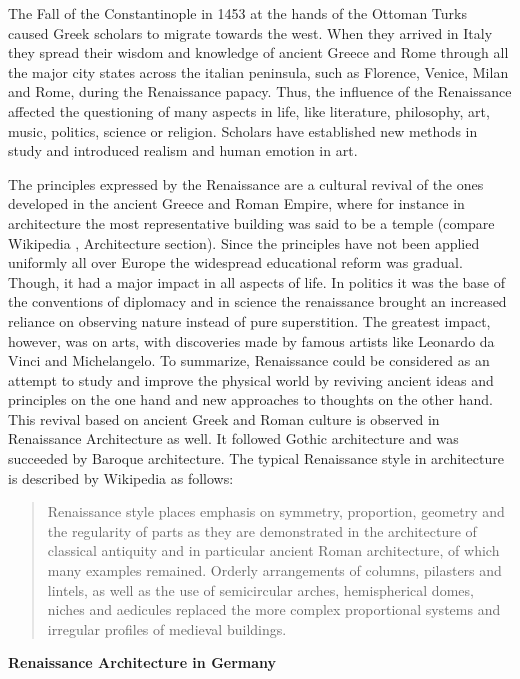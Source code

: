 The Fall of the Constantinople in 1453 at the hands of the Ottoman Turks caused Greek scholars to migrate towards the west. When they arrived in Italy they spread their wisdom and knowledge of ancient Greece and Rome through all the major city states across the italian peninsula, such as Florence, Venice, Milan and Rome, during the Renaissance papacy. Thus, the influence of the Renaissance affected the questioning of many aspects in life, like literature, philosophy, art, music, politics, science or religion. Scholars have established new methods in study and introduced realism and human emotion in art. 

The principles expressed by the Renaissance are a cultural revival of the ones developed in the ancient Greece and Roman Empire, where for instance in architecture the most representative building was said to be a temple (compare Wikipedia \parencite{wiki:Ancient_greek_roman_principles}, Architecture section). Since the principles have not been applied uniformly all over Europe the widespread educational reform was gradual. Though, it had a major impact in all aspects of life. In politics it was the base of the conventions of diplomacy and in science the renaissance brought an increased reliance on observing nature instead of pure superstition. The greatest impact, however, was on arts, with discoveries made by famous artists like Leonardo da Vinci and Michelangelo. To summarize, Renaissance could be considered as an attempt to study and improve the physical world by reviving ancient ideas and principles on the one hand and new approaches to thoughts on the other hand.\\

This revival based on ancient Greek and Roman culture is observed in Renaissance Architecture as well. It followed Gothic architecture and was succeeded by Baroque architecture. The typical Renaissance style in architecture is described by Wikipedia \parencite{wiki:Renaissance} as follows:

\blockquote{
	Renaissance style places emphasis on symmetry, proportion, geometry and the regularity of parts as they are demonstrated in the architecture of classical antiquity and in particular ancient Roman architecture, of which many examples remained. Orderly arrangements of columns, pilasters and lintels, as well as the use of semicircular arches, hemispherical domes, niches and aedicules replaced the more complex proportional systems and irregular profiles of medieval buildings.	
}

\textbf{Renaissance Architecture in Germany}\\

